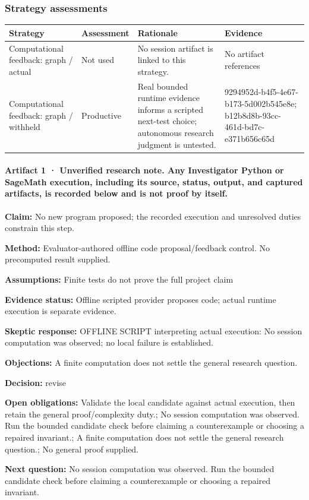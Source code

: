 \documentclass[11pt]{article}
\begin{document}
\subsubsection*{Strategy assessments}
\begin{longtable}{>{\raggedright\arraybackslash}p{.16\linewidth}>{\raggedright\arraybackslash}p{.15\linewidth}>{\raggedright\arraybackslash}p{.40\linewidth}>{\raggedright\arraybackslash}p{.17\linewidth}}
\toprule Strategy & Assessment & Rationale & Evidence \\
\midrule\endhead
Computational feedback: graph / actual & Not used & No session artifact is linked to this strategy. & No artifact references \\
Computational feedback: graph / withheld & Productive & Real bounded runtime evidence informs a scripted next-test choice; autonomous research judgment is untested. & 9294952d-b4f5-4e67-b173-5d002b545e8e; b12b8d8b-93cc-461d-bd7c-e371b656c65d \\
\bottomrule
\end{longtable}
\paragraph{Artifact 1 · Unverified research note. Any Investigator Python or SageMath execution, including its source, status, output, and captured artifacts, is recorded below and is not proof by itself.}
\textbf{Claim:} No new program proposed; the recorded execution and unresolved duties constrain this step.\par
\textbf{Method:} Evaluator-authored offline code proposal/feedback control. No precomputed result supplied.\par
\textbf{Assumptions:} Finite tests do not prove the full project claim\par
\textbf{Evidence status:} Offline scripted provider proposes code; actual runtime execution is separate evidence.\par
\textbf{Skeptic response:} OFFLINE SCRIPT interpreting actual execution: No session computation was observed; no local failure is established.\par
\textbf{Objections:} A finite computation does not settle the general research question.\par
\textbf{Decision:} revise\par
\textbf{Open obligations:} Validate the local candidate against actual execution, then retain the general proof/complexity duty.; No session computation was observed. Run the bounded candidate check before claiming a counterexample or choosing a repaired invariant.; A finite computation does not settle the general research question.; No general proof supplied.\par
\textbf{Next question:} No session computation was observed. Run the bounded candidate check before claiming a counterexample or choosing a repaired invariant.\par
\end{document}
